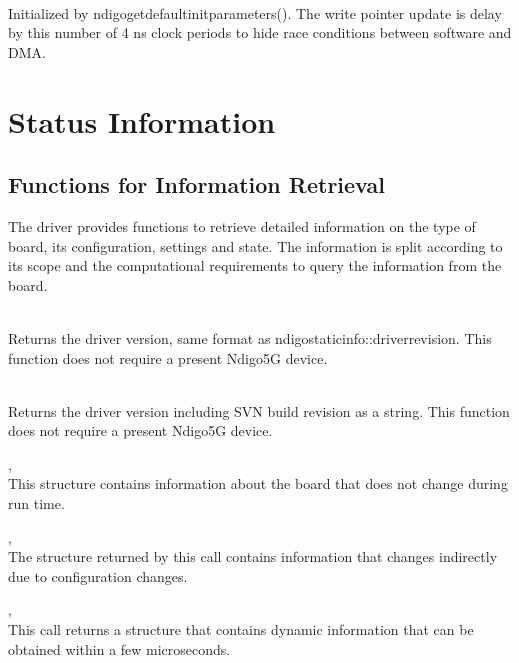 			\\
			Initialized by \textsf{ndigo\tu get\tu default\tu init\tu parameters()}. The write pointer update is delay by this number of 4 ns clock periods to hide race conditions between software and DMA.
	\section{Status Information}
		\subsection{Functions for Information Retrieval}
		
			The driver provides functions to retrieve detailed information on the type of board, its configuration, settings and state. The information is split according to its scope and the computational requirements to query the information from the board.\par
			
			\\
			Returns the driver version, same format as ndigo\tu static\tu info::driver\tu revision. This function does not require a
			present Ndigo5G device.

			\\
			Returns the driver version including SVN build revision as a string. This function does not require a
			present Ndigo5G device.
			
			,\\
			This structure contains information about the board that does not change during run time.\par

			, \\
			The structure returned by this call contains information that changes indirectly due to configuration changes.\par

			, \\
			This call returns a structure that contains dynamic information that can be obtained within a few microseconds.\par

